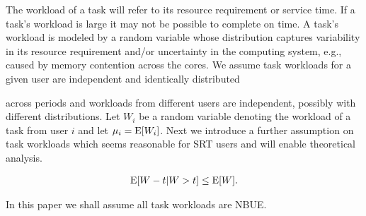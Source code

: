 \documentclass[prodmode,acmtompecs]{acmsmall}
\newcommand{\myComments}[1]{}
\newif\ifinfocom
\newif\iftompecs
\newif\ifdissertation
\newcommand{\infocomStart}{\ifinfocom \myComments{Infocom: }}
\newcommand{\tompecsStart}{\iftompecs \myComments{TOMPECS version: }}
\newcommand{\dissertationStart}{\ifdissertation  \myComments{Dissertation version: }}
\newcommand{\commentEnd}{\myComments{End}}
\begin{document}
The workload of a task will refer to its resource requirement or service time. If a task's workload is large it may not be possible to complete on time. 
A task's workload is modeled by a random variable whose distribution captures variability in its resource requirement and/or uncertainty in the computing system, e.g., caused by memory contention across the cores. 
We assume task workloads for a given user are independent and identically distributed 
\tompecsStart
(i.i.d.)
\commentEnd\fi
across periods and workloads from different users are independent, possibly with different distributions. Let $W_i$ be a random variable denoting the workload of a task from user $i$ and let $\mu_i = \operatorname*{\mathrm{E}}[W_i]$. 
Next we introduce a further assumption on task workloads which seems reasonable for SRT users and will enable theoretical analysis. 

\begin{definition}
\infocomStart
A non-negative random variable $W$ is said to satisfy {\bf New Better than Used in Expectation (NBUE)} if for all $t > 0$, 
\commentEnd\fi
\tompecsStart
A non-negative random variable $W$ is said to satisfy {\bf New Better than Used in Expectation (NBUE)} if for all $t > 0$, 
\commentEnd\fi
\begin{align}
\label{align_NBUE}
\operatorname*{\mathrm{E}}[W - t | W > t] \leq \operatorname*{\mathrm{E}}[W]. 
\end{align}
\end{definition}
\dissertationStart
The exponential and geometric distributions are special NBUE distributions since they result in equality in the above for all $t>0$ and for all integers $t>0$, respectively. 
\commentEnd\fi
\dissertationStart
The notion of NBUE, see, e.g., \cite{MuS02b}\cite{ShS07b}, captures workload/lifetime distributions where the expected residual workload/lifetime of a task/device of age $t$ is no more than that of a new task/device. 
By \cite{ShS07b} the set of NBUE distributions is closed under convolution. Formally one can show the following results:
\begin{proposition}
\label{prop_NBUE_closure}
The NBUE property satisfies the following, 
\begin{itemize}
\item If two independent random variables $W, V$ are NBUE, then $W+V$ is NBUE. 
\item If a random variable $W$ is NBUE, then for all real numbers $c > 0$, $cW$ is NBUE. 
\end{itemize}
\end{proposition}
\myComments{end}
\fi
In this paper we shall assume all task workloads are NBUE. 
\end{document}
